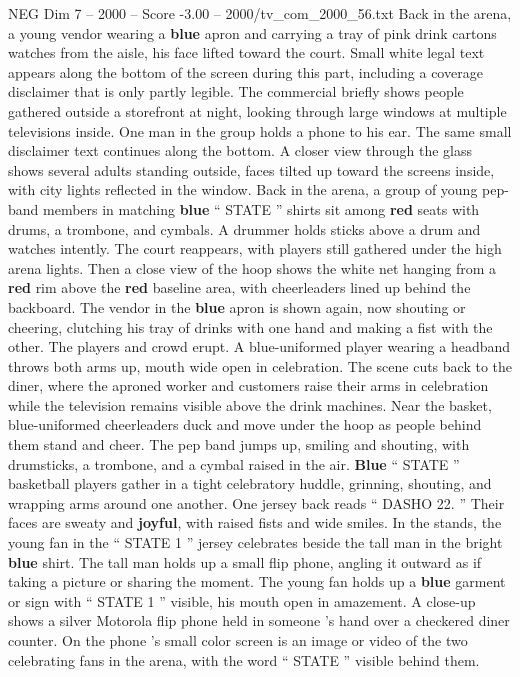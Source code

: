 \begin{textsample}{NEG Dim 7 – 2000 – Score -3.00 – 2000/tv\_com\_2000\_56.txt}
Back in the arena, a young vendor wearing a \textbf{blue} apron and carrying a tray of pink drink cartons watches from the aisle, his face lifted toward the court.
Small white legal text appears along the bottom of the screen during this part, including a coverage disclaimer that is only partly legible.
The commercial briefly shows people gathered outside a storefront at night, looking through large windows at multiple televisions inside.
One man in the group holds a phone to his ear.
The same small disclaimer text continues along the bottom.
A closer view through the glass shows several adults standing outside, faces tilted up toward the screens inside, with city lights reflected in the window.
Back in the arena, a group of young pep-band members in matching \textbf{blue} “ STATE ” shirts sit among \textbf{red} seats with drums, a trombone, and cymbals.
A drummer holds sticks above a drum and watches intently.
The court reappears, with players still gathered under the high arena lights.
Then a close view of the hoop shows the white net hanging from a \textbf{red} rim above the \textbf{red} baseline area, with cheerleaders lined up behind the backboard.
The vendor in the \textbf{blue} apron is shown again, now shouting or cheering, clutching his tray of drinks with one hand and making a fist with the other.
The players and crowd erupt.
A blue-uniformed player wearing a headband throws both arms up, mouth wide open in celebration.
The scene cuts back to the diner, where the aproned worker and customers raise their arms in celebration while the television remains visible above the drink machines.
Near the basket, blue-uniformed cheerleaders duck and move under the hoop as people behind them stand and cheer.
The pep band jumps up, smiling and shouting, with drumsticks, a trombone, and a cymbal raised in the air. \textbf{Blue} “ STATE ” basketball players gather in a tight celebratory huddle, grinning, shouting, and wrapping arms around one another.
One jersey back reads “ DASHO 22. ” Their faces are sweaty and \textbf{joyful}, with raised fists and wide smiles.
In the stands, the young fan in the “ STATE 1 ” jersey celebrates beside the tall man in the bright \textbf{blue} shirt.
The tall man holds up a small flip phone, angling it outward as if taking a picture or sharing the moment.
The young fan holds up a \textbf{blue} garment or sign with “ STATE 1 ” visible, his mouth open in amazement.
A close-up shows a silver Motorola flip phone held in someone ’s hand over a checkered diner counter.
On the phone ’s small color screen is an image or video of the two celebrating fans in the arena, with the word “ STATE ” visible behind them.

\end{textsample}
